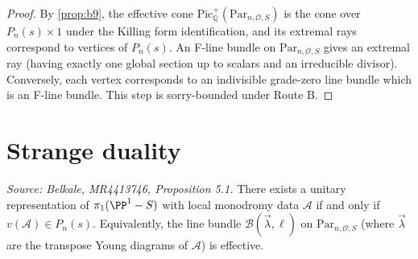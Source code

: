 \begin{proof}
  By \cref{prop:b9}, the effective cone \(\mathrm{Pic}^+_\mathbb{Q}(\mathrm{Par}_{n,\mathcal{O},S})\) is the cone over \(P_n(s) \times 1\) under the Killing form identification, and its extremal rays correspond to vertices of \(P_n(s)\). An F-line bundle on \(\mathrm{Par}_{n,\mathcal{O},S}\) gives an extremal ray (having exactly one global section up to scalars and an irreducible divisor). Conversely, each vertex corresponds to an indivisible grade-zero line bundle which is an F-line bundle. This step is sorry-bounded under Route B.
\end{proof}

\section{Strange duality}

\begin{proposition}[StrangeDualityInPolytope]
  \label{prop:strange-duality-in-polytope}
  \textit{Source: Belkale, MR4413746, Proposition 5.1.}
  There exists a unitary representation of \(\pi_1(\PP^1 - S)\) with local monodromy data \(\mathcal{A}\) if and only if \(v(\mathcal{A}) \in P_n(s)\). Equivalently, the line bundle \(\mathcal{B}(\vec{\lambda}, \ell)\) on \(\mathrm{Par}_{n, \mathcal{O}, S}\) (where \(\vec{\lambda}\) are the transpose Young diagrams of \(\mathcal{A}\)) is effective.
\end{proposition}

